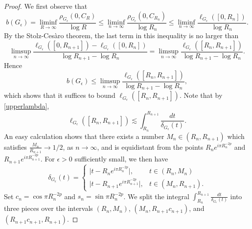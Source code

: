 \documentclass[10pt,a4paper]{amsart}
\begin{document}
\begin{proof}
We first observe that 
\[
b(G_\epsilon)=\liminf_{R\to\infty}\frac{\rho_{G_\epsilon}(0,C_R)}{\log R}\leq \liminf_{n\to \infty}\frac{\rho_{G_\epsilon}(0,C_{R_n})}{\log R_n}\leq \liminf_{n\to \infty}\frac{\ell_{G_\epsilon}([0,R_n])}{\log R_n}.
\]
By the Stolz-Ces\`{a}ro theorem, the last term in this inequality is no larger than
\[
\limsup_{n\to \infty}\frac{\ell_{G_\epsilon}([0,R_{n+1}])-\ell_{G_\epsilon}([0,R_n])}{\log R_{n+1}-\log R_n}=\limsup_{n\to \infty}\frac{\ell_{G_\epsilon}([R_n,R_{n+1}])}{\log R_{n+1}-\log R_n}.
\]
Hence
\begin{equation}\label{L1Eq1}
	b(G_\epsilon)\leq \limsup_{n\to \infty}\frac{\ell_{G_\epsilon}([R_n,R_{n+1}])}{\log R_{n+1}-\log R_n},
\end{equation}
which shows that it suffices to bound $\ell_{G_\epsilon}([R_n,R_{n+1}])$. Note that by \eqref{upperlambda},
\[
\ell_{G_\epsilon}([R_n,R_{n+1}]) \lesssim \int_{R_n}^{R_{n+1}}\frac{dt}{\delta_{G_\epsilon}(t)}.
\]
An easy calculation shows that there exists a number $M_n\in (R_n,R_{n+1})$ which satisfies $\frac{M_n}{R_{n+1}}\to 1/2$, as $n\to\infty$, and is equidistant from the points $R_n e^{i\pi R_n^{-2p}}$ and $R_{n+1}e^{i\pi R_{n+1}^{-2p}}$. For $\epsilon>0$ sufficiently small, we then have
\[\delta_{G_\epsilon}(t)= \begin{cases} 
	\big| t-R_n e^{i\pi R_n^{-2p}}\big|, & t\in (R_n,M_n) \\
	\big| t-R_{n+1} e^{i\pi R_{n+1}^{-2p}}\big|, & t\in (M_n,R_{n+1}).
\end{cases}
\]
Set $c_n=\cos\pi R_n^{-2p}$ and $s_n=\sin\pi R_n^{-2p}$. We split the integral $\int_{R_n}^{R_{n+1}}\frac{dt}{\delta_{G_\epsilon}(t)}$ into three pieces over the intervals  $(R_n,M_n)$, $(M_n,R_{n+1}c_{n+1})$,  and \\ $(R_{n+1}c_{n+1},R_{n+1})$.


\end{proof}
\end{document}
